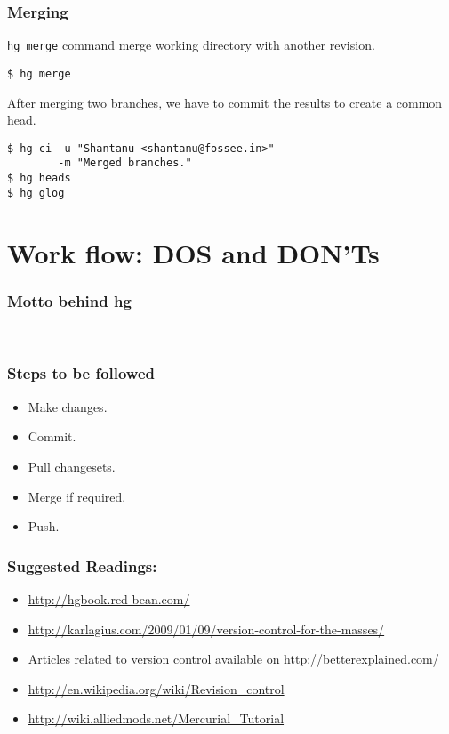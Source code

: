 \documentclass[14pt,compress]{beamer}
\newcommand{\typ}[1]{\lstinline{#1}}
\begin{document}
\begin{frame}[fragile]
  \frametitle{Merging}
  \typ{hg merge} command merge working directory with another revision.
  \begin{lstlisting}
$ hg merge    
  \end{lstlisting} %
  After merging two branches, we have to commit the results to create a common head.
  \begin{lstlisting}
$ hg ci -u "Shantanu <shantanu@fossee.in>" 
        -m "Merged branches."
$ hg heads    
$ hg glog
  \end{lstlisting} %
\end{frame}

\section{Work flow: DOS and DON'Ts}

\begin{frame}
  \frametitle{Motto behind hg}
  \begin{center}
  \color{red}{``Commit Early Commit Often.''}\\  
  \end{center}  
\end{frame}

\begin{frame}
  \frametitle{Steps to be followed}
  \begin{itemize}
  \item Make changes.
  \item Commit.
  \item Pull changesets.
  \item Merge if required.
  \item Push.
  \end{itemize}
\end{frame}

\begin{frame}
  \frametitle{Suggested Readings:}
  \begin{itemize}
  \item \url{http://hgbook.red-bean.com/}
  \item \url{http://karlagius.com/2009/01/09/version-control-for-the-masses/}
  \item Articles related to version control available on \url{http://betterexplained.com/}
  \item \url{http://en.wikipedia.org/wiki/Revision_control}
  \item \url{http://wiki.alliedmods.net/Mercurial_Tutorial}
  \end{itemize}
\end{frame}
\end{document}
